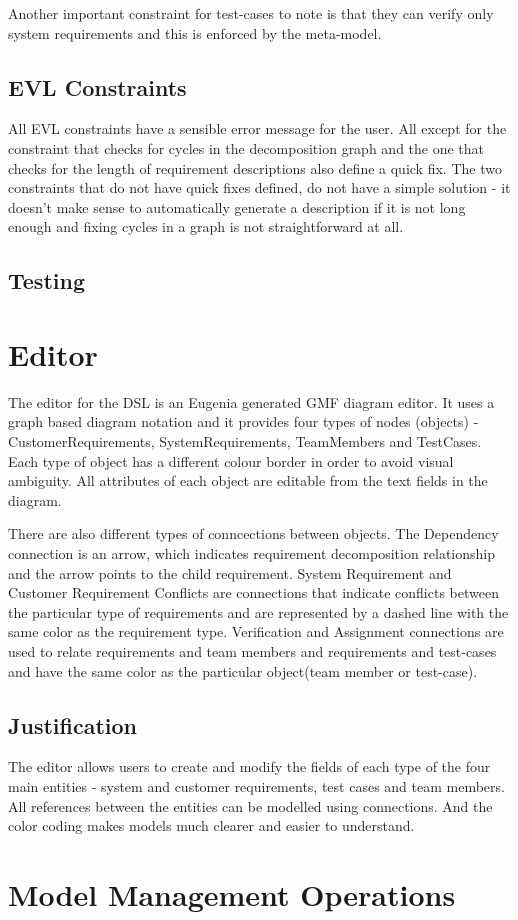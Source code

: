 \documentclass[11pt,a4paper]{scrartcl}
\begin{document}
	Another important constraint for test-cases to note is that they can verify only system requirements and this is enforced by the meta-model.
	
	\subsection{EVL Constraints}
	All EVL constraints have a sensible error message for the user. All except for the constraint that checks for cycles in the decomposition graph and the one that checks for the length of requirement descriptions also define a quick fix. The two constraints that do not have quick fixes defined, do not have a simple solution - it doesn't make sense to automatically generate a description if it is not long enough and fixing cycles in a graph is not straightforward at all. 
	
	\subsection{Testing}
	
	

	\section{Editor}
	The editor for the DSL is an Eugenia generated GMF diagram editor. It uses a graph based diagram notation and it provides four types of nodes (objects) - CustomerRequirements, SystemRequirements, TeamMembers and TestCases. Each type of object has a different colour border in order to avoid visual ambiguity. All attributes of each object are editable from the text fields in the diagram.
	
	There are also different types of conncections between objects. The Dependency connection is an arrow, which indicates requirement decomposition relationship and the arrow points to the child requirement. System Requirement and Customer Requirement Conflicts are connections that indicate conflicts between the particular type of requirements and are represented by a dashed line with the same color as the requirement type. Verification and Assignment connections are used to relate requirements and team members and requirements and test-cases and have the same color as the particular object(team member or test-case).
	
	
	\subsection{Justification}
	The editor allows users to create and modify the fields of each type of the four main entities - system and customer requirements, test cases and team members. All references between the entities can be modelled using connections. And the color coding makes models much clearer and easier to understand.



\section{Model Management Operations}

	
\end{document}
